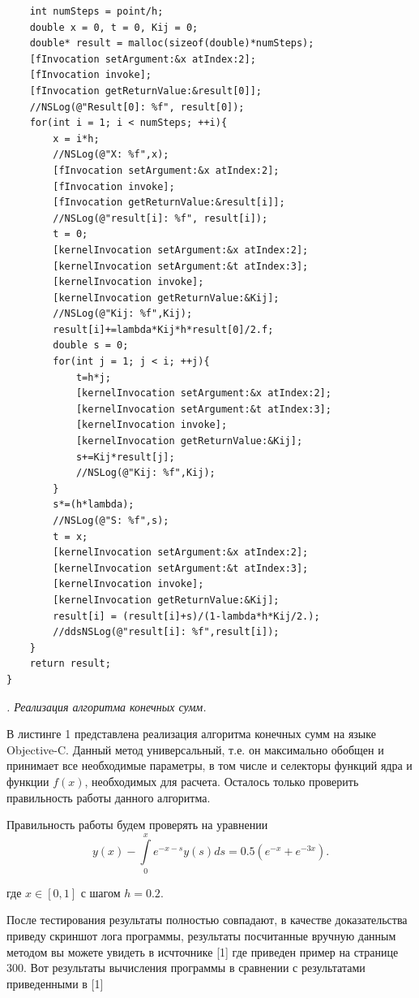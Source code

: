 \begin{lstlisting}
    int numSteps = point/h;
    double x = 0, t = 0, Kij = 0;
    double* result = malloc(sizeof(double)*numSteps);
    [fInvocation setArgument:&x atIndex:2];
    [fInvocation invoke];
    [fInvocation getReturnValue:&result[0]];
    //NSLog(@"Result[0]: %f", result[0]);
    for(int i = 1; i < numSteps; ++i){
        x = i*h;
        //NSLog(@"X: %f",x);
        [fInvocation setArgument:&x atIndex:2];
        [fInvocation invoke];
        [fInvocation getReturnValue:&result[i]];
        //NSLog(@"result[i]: %f", result[i]);
        t = 0;
        [kernelInvocation setArgument:&x atIndex:2];
        [kernelInvocation setArgument:&t atIndex:3];
        [kernelInvocation invoke];
        [kernelInvocation getReturnValue:&Kij];
        //NSLog(@"Kij: %f",Kij);
        result[i]+=lambda*Kij*h*result[0]/2.f;
        double s = 0;
        for(int j = 1; j < i; ++j){
            t=h*j;
            [kernelInvocation setArgument:&x atIndex:2];
            [kernelInvocation setArgument:&t atIndex:3];
            [kernelInvocation invoke];
            [kernelInvocation getReturnValue:&Kij];
            s+=Kij*result[j];
            //NSLog(@"Kij: %f",Kij);
        }
        s*=(h*lambda);
        //NSLog(@"S: %f",s);
        t = x;
        [kernelInvocation setArgument:&x atIndex:2];
        [kernelInvocation setArgument:&t atIndex:3];
        [kernelInvocation invoke];
        [kernelInvocation getReturnValue:&Kij];
        result[i] = (result[i]+s)/(1-lambda*h*Kij/2.);
        //ddsNSLog(@"result[i]: %f",result[i]);
    }
    return result;
}
\end{lstlisting} \textit{. Реализация алгоритма конечных сумм.}

В листинге 1 представлена реализация алгоритма конечных сумм на языке Objective-C. Данный метод универсальный, т.е. он максимально обобщен и принимает все необходимые параметры, в том числе и селекторы функций ядра и функции $f(x)$, необходимых для расчета. Осталось только проверить правильность работы данного алгоритма.

Правильность работы будем проверять на уравнении
\begin{equation}
y(x) - \int\limits_0^x e^{-x-s} y(s) ds = 0.5 (e^{-x} + e^{-3x}).
\end{equation}

где $x \in [0, 1]$ с шагом $h = 0.2$.

После тестирования результаты полностью совпадают, в качестве доказательства приведу скриншот лога программы, результаты посчитанные вручную данным методом вы можете увидеть в исчточнике [1] где приведен пример на странице 300. Вот результаты вычисления программы в сравнении с результатами приведенными в [1]

